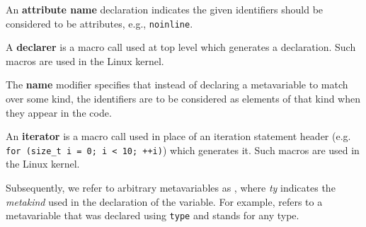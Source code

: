 An {\bf attribute name} declaration indicates the given identifiers should be
considered to be attributes, e.g., \texttt{noinline}.

A {\bf declarer} is a macro call used at top level which generates a
declaration. Such macros are used in the Linux kernel.

The {\bf name} modifier specifies that instead of declaring a metavariable to
match over some kind, the identifiers are to be considered as elements of that
kind when they appear in the code.

An {\bf iterator} is a macro call used in place of an iteration statement header
(e.g. {\tt for (size\_t i = 0; i < 10; ++i)}) which generates it. Such macros
are used in the Linux kernel.

Subsequently, we refer to arbitrary metavariables as
, where {\it{ty}}
indicates the {\it metakind} used in the declaration of the variable.
For example,  refers to a metavariable
that was declared using \texttt{type} and stands for any type.


